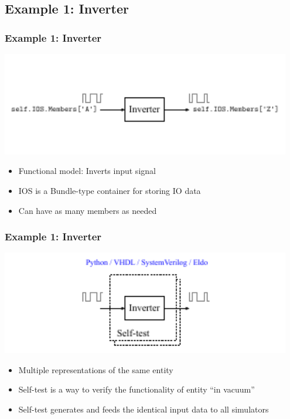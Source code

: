 \documentclass{sdkslides}
\begin{document}

\renewcommand{\sectionname}{Example 1: Inverter}
\subsection*{\sectionname}
\begin{frame}[t]
    \frametitle{\sectionname}
    \begin{center}
        \includegraphics[width=0.95\textwidth]{Pics/inverter_single_1}
    \end{center}
    \begin{itemize}
        \item Functional model: Inverts input signal
        \item IOS is a Bundle-type container for storing IO data
        \item Can have as many members as needed
    \end{itemize}
\end{frame}

\begin{frame}[t]
    \frametitle{\sectionname}
    \begin{center}
        \includegraphics[width=0.95\textwidth]{Pics/inverter_single_2}
    \end{center}
    \begin{itemize}
        \item Multiple representations of the same entity
        \item Self-test is a way to verify the functionality of entity ``in
            vacuum''
        \item Self-test generates and feeds the identical input
            data to all simulators
    \end{itemize}
\end{frame}
\end{document}

